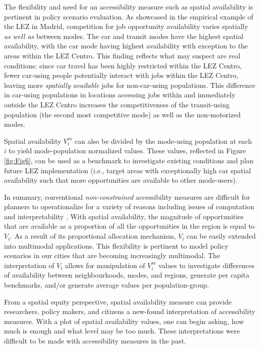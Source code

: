 \documentclass[]{trbunofficial}
\begin{document}
The flexibility and need for an accessibility measure such as spatial
availability is pertinent in policy scenario evaluation. As showcased in
the empirical example of the LEZ in Madrid, competition for job
opportunity availability varies spatially \emph{as well as} between
modes. The car and transit modes have the highest spatial availability,
with the car mode having highest availability with exception to the
areas within the LEZ Centro. This finding reflects what may suspect are
real conditions: since car travel has been highly restricted within the
LEZ Centro, fewer car-using people potentially interact with jobs within
the LEZ Centro, leaving more \emph{spatially available} jobs for
non-car-using populations. This difference in car-using populations in
locations accessing jobs within and immediately outside the LEZ Centro
increases the competitiveness of the transit-using population (the
second most competitive mode) as well as the non-motorized modes.

Spatial availability \(V_i^m\) can also be divided by the mode-using
population at each \(i\) to yield mode-population normalized values.
These values, reflected in Figure \ref{fig:Fig6}, can be used as a
benchmark to investigate existing conditions and plan future LEZ
implementation (i.e., target areas with exceptionally high car spatial
availability such that more opportunities are available to other
mode-users).

In summary, conventional \emph{non-constrained} accessibility measures
are difficult for planners to operationalize for a variety of reasons
including issues of computation and interpretability
\citep{levinsonTransportAccessManual2020}. With spatial availability,
the magnitude of opportunities that are available as a proportion of all
the opportunities in the region is equal to \(V_i\). As a result of its
proportional allocation mechanism, \(V_i\) can be easily extended into
multimodal applications. This flexibility is pertinent to model policy
scenarios in our cities that are becoming increasingly multimodal. The
interpretation of \(V_i\) allows for manipulation of \(V_i^m\) values to
investigate differences of availability between neighbourhoods, modes,
and regions, generate per capita benchmarks, and/or generate average
values per population-group.

From a spatial equity perspective, spatial availability measure can
provide researchers, policy makers, and citizens a new-found
interpretation of accessibility measures. With a plot of spatial
availability values, one can begin asking, how much is enough and what
level may be too much. These interpretations were difficult to be made
with accessibility measures in the past.
\end{document}

